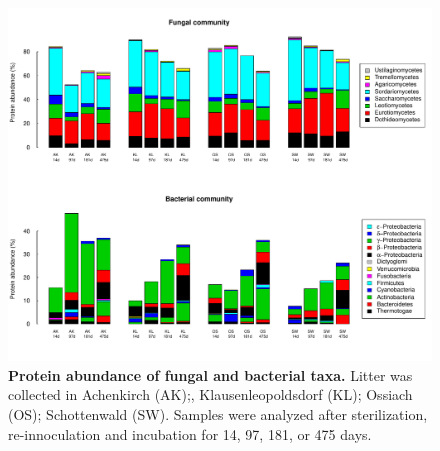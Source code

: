 \documentclass[10pt]{article}
\begin{document}
\begin{flushleft}
\newpage
\begin{figure}[h!]
\vspace*{2mm}
\begin{center}
\includegraphics{ligpaper-metaprot2}
\end{center}
\caption{
{\bf Protein abundance of fungal and bacterial taxa.} Litter was collected in Achenkirch (AK);, Klausenleopoldsdorf (KL); Ossiach (OS); Schottenwald (SW). Samples were analyzed after sterilization, re-innoculation and incubation for 14, 97, 181, or 475 days.}
\label{fig:metaprot_barplot}
\end{figure}



\end{flushleft}
\end{document}
